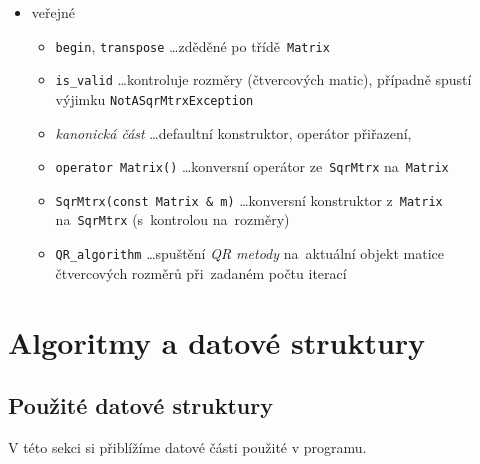 \documentclass[11pt,a4paper]{article}
\begin{document}
\begin{itemize}
  \item veřejné
  \begin{itemize}
    \item \verb=begin=, \verb=transpose= \ldots zděděné po třídě~\verb=Matrix=
    \item \verb=is_valid= \ldots kontroluje rozměry (čtvercových matic),
      případně spustí výjimku \verb=NotASqrMtrxException=
    \item \emph{kanonická část\/} \ldots defaultní konstruktor, operátor
      přiřazení, 
    \item \verb=operator Matrix()= \ldots konversní operátor ze~\verb=SqrMtrx=
      na~\verb=Matrix=
    \item \verb=SqrMtrx(const Matrix & m)= \ldots konversní konstruktor
      z~\verb=Matrix= na~\verb=SqrMtrx= (s~kontrolou na~rozměry)
    \item \verb=QR_algorithm= \ldots spuštění \emph{QR metody\/} \cite{qr-meth}
      na~aktuální objekt matice čtvercových rozměrů při~zadaném počtu iterací
  \end{itemize}
\end{itemize}

\section{Algoritmy a datové struktury}
\subsection{Použité datové struktury}
V této sekci si přiblížíme datové části použité v programu.
\end{document}
